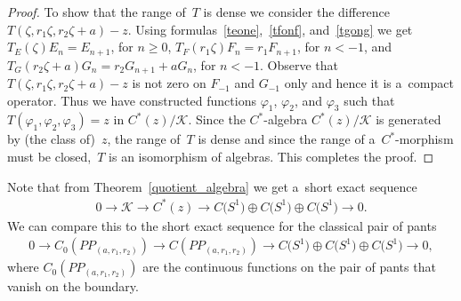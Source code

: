\documentclass[pdftex]{sigma}
\numberwithin{equation}{section}
\begin{document}
\begin{proof}
To show that the range of~$T$ is dense we consider the dif\/ference $T(\zeta,r_1\zeta, r_2\zeta+a)-z$.
Using formulas~\eqref{teone},~\eqref{tfonf}, and~\eqref{tgong} we get $T_E(\zeta)E_n=E_{n+1}$, for $n\geq 0$,
$T_F(r_1\zeta)F_n=r_1F_{n+1}$, for $n<-1$, and $T_G(r_2\zeta+a)G_n=r_2G_{n+1}+aG_n$, for $n<-1$.
Observe that $T(\zeta,r_1\zeta, r_2\zeta+a)-z$ is not zero on $F_{-1}$ and $G_{-1}$ only and hence it is a~compact operator.
Thus we have constructed functions $\varphi_1$, $\varphi_2$, and $\varphi_3$ such that $T(\varphi_1,\varphi_2,\varphi_3)
= z$ in $C^*(z)/\mathcal{K}$.
Since the $C^*$-algebra $C^*(z)/\mathcal{K}$ is generated by (the class of)~$z$, the range of~$T$ is dense and since the
range of a~$C^*$-morphism must be closed,~$T$ is an isomorphism of algebras.
This completes the proof.
\end{proof}

Note that from Theorem~\ref{quotient_algebra} we get a~short exact sequence
\begin{gather*}
0\rightarrow \mathcal{K}\rightarrow C^*(z)\rightarrow C\big(S^1\big)\oplus C\big(S^1\big)\oplus C\big(S^1\big)\rightarrow 0.
\end{gather*}
We can compare this to the short exact sequence for the classical pair of pants
\begin{gather*}
0\rightarrow C_0(PP_{(a, r_1,r_2)})\rightarrow C(PP_{(a, r_1,r_2)})\rightarrow C\big(S^1\big)\oplus C\big(S^1\big)\oplus C\big(S^1\big)\rightarrow 0,
\end{gather*}
where $C_0(PP_{(a, r_1,r_2)})$ are the continuous functions on the pair of pants that vanish on the boundary.
\end{document}
